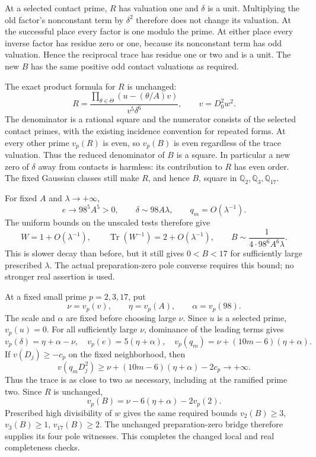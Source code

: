 At a selected contact prime, $R$ has valuation one and $\delta$ is a
unit. Multiplying the old factor's nonconstant term by $\delta^2$
therefore does not change its valuation. At the successful place every
factor is one modulo the prime. At either place every inverse factor
has residue zero or one, because its nonconstant term has odd valuation.
Hence the reciprocal trace has residue one or two and is a unit.
The new $B$ has the same positive odd contact valuations as required.

The exact product formula for $R$ is unchanged:
\[
 R=\frac{\prod_{\theta\in\Theta}(u-(\theta/A)v)}
          {v^5\delta^6},\qquad v=D_0^2w^2.
\]
The denominator is a rational square and the numerator consists of the
selected contact primes, with the existing incidence convention for
repeated forms. At every other prime $v_p(R)$ is even, so $v_p(B)$ is
even regardless of the trace valuation. Thus the reduced denominator
of $B$ is a square. In particular a new zero of $\delta$ away from
contacts is harmless: its contribution to $R$ has even order. The
fixed Gaussian classes still make $R$, and hence $B$, square in
$\mathbb Q_2,\mathbb Q_3,\mathbb Q_{17}$.

For fixed $A$ and $\lambda\to+\infty$,
\[
 e\longrightarrow98^5A^5>0,\qquad
 \delta\sim98A\lambda,\qquad q_m=O(\lambda^{-1}).
\]
The uniform bounds on the unscaled tests therefore give
\[
 W=1+O(\lambda^{-1}),\qquad
 \operatorname{Tr}(W^{-1})=2+O(\lambda^{-1}),\qquad
 B\sim\frac{1}{4\cdot98^6A^6\lambda}.
\]
This is slower decay than before, but it still gives $0<B<17$ for
sufficiently large prescribed $\lambda$. The actual preparation-zero
pole converse requires this bound; no stronger real assertion is used.

At a fixed small prime $p=2,3,17$, put
\[
 \nu=v_p(v),\qquad\eta=v_p(A),\qquad\alpha=v_p(98).
\]
The scale and $\alpha$ are fixed before choosing large $\nu$.
Since $u$ is a selected prime, $v_p(u)=0$. For all sufficiently large
$\nu$, dominance of the leading terms gives
\[
 v_p(\delta)=\eta+\alpha-\nu,\quad
 v_p(e)=5(\eta+\alpha),\quad
 v_p(q_m)=\nu+(10m-6)(\eta+\alpha).
\]
If $v(D_j)\ge-c_p$ on the fixed neighborhood, then
\[
 v(q_mD_j^2)\ge\nu+(10m-6)(\eta+\alpha)-2c_p
             \longrightarrow+\infty.
\]
Thus the trace is as close to two as necessary, including at the
ramified prime two. Since $R$ is unchanged,
\[
 v_p(B)=\nu-6(\eta+\alpha)-2v_p(2).
\]
Prescribed high divisibility of $w$ gives the same required bounds
$v_2(B)\ge3$, $v_3(B)\ge1$, $v_{17}(B)\ge2$. The unchanged
preparation-zero bridge therefore supplies its four pole witnesses.
This completes the changed local and real completeness checks.

